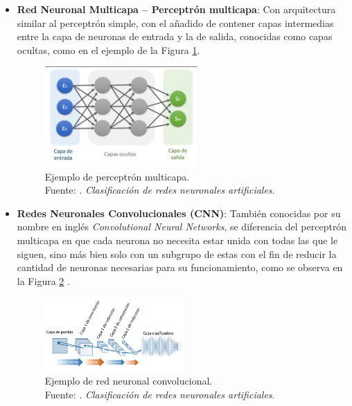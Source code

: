 \begin{itemize}
\begin{itemize}
		\newpage
		\item \textbf{Red Neuronal Multicapa – Perceptrón multicapa}: Con arquitectura similar al perceptrón simple, con el añadido de contener capas intermedias entre la capa de neuronas de entrada y la de salida, conocidas como capas ocultas, como en el ejemplo de la Figura \ref{2:fig23}.
		\begin{figure}[h]
			\begin{center}
				\includegraphics[width=0.55\textwidth]{2/figures/perceptron_multicapa.jpg}
				\caption[Ejemplo de perceptrón multicapa]{Ejemplo de perceptrón multicapa.\\
				Fuente: \cite{gl_calvo2017clasifrna}. \textit{Clasificación de redes neuronales artificiales}.}
				\label{2:fig23}
			\end{center}
		\end{figure}
		
		\item \textbf{Redes Neuronales Convolucionales (CNN)}: También conocidas por su nombre en inglés \textit{Convolutional Neural Networks}, se diferencia del perceptrón multicapa en que cada neurona no necesita estar unida con todas las que le siguen, sino más bien solo con un subgrupo de estas con el fin de reducir la cantidad de neuronas necesarias para su funcionamiento, como se observa en la Figura \ref{2:fig24} \parencite{gl_calvo2017clasifrna}.
		\begin{figure}[h]
			\begin{center}
				\includegraphics[width=0.50\textwidth]{2/figures/cnn.jpg}
				\caption[Ejemplo de red neuronal convolucional]{Ejemplo de red neuronal convolucional.\\
				Fuente: \cite{gl_calvo2017clasifrna}. \textit{Clasificación de redes neuronales artificiales}.}
				\label{2:fig24}
			\end{center}
		\end{figure}
		

\end{itemize}
\end{itemize}

